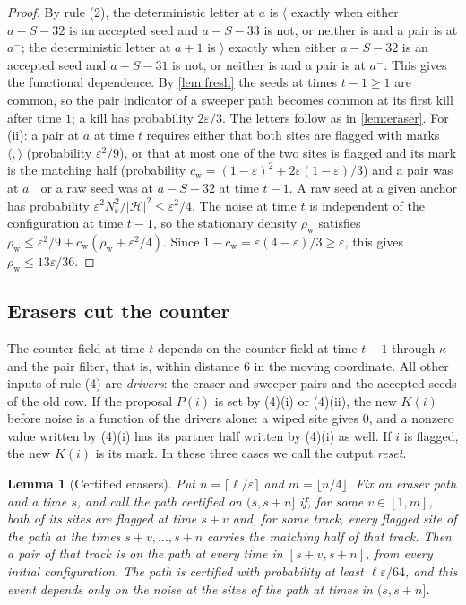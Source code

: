 \documentclass[11pt]{article}
\theoremstyle{plain}
\newtheorem{lemma}[theorem]{Lemma}
\theoremstyle{definition}
\theoremstyle{remark}
\newcommand{\eps}{\varepsilon}
\newcommand{\Hs}{\mathcal H}
\begin{document}
\begin{proof}
By rule (2), the deterministic letter at $a$ is $\langle$ exactly when either $a-S-32$ is an accepted seed and $a-S-33$ is not, or neither is and a pair is at $a^-$; the deterministic letter at $a+1$ is $\rangle$ exactly when either $a-S-32$ is an accepted seed and $a-S-31$ is not, or neither is and a pair is at $a^-$. This gives the functional dependence. By \cref{lem:fresh} the seeds at times $t-1\ge1$ are common, so the pair indicator of a sweeper path becomes common at its first kill after time $1$; a kill has probability $2\eps/3$. The letters follow as in \cref{lem:eraser}. For (ii): a pair at $a$ at time $t$ requires either that both sites are flagged with marks $\langle,\rangle$ (probability $\eps^2/9$), or that at most one of the two sites is flagged and its mark is the matching half (probability $c_{\mathrm w}=(1-\eps)^2+2\eps(1-\eps)/3$) and a pair was at $a^-$ or a raw seed was at $a-S-32$ at time $t-1$. A raw seed at a given anchor has probability $\eps^2N_{\mathrm s}^2/|\Hs|^2\le\eps^2/4$. The noise at time $t$ is independent of the configuration at time $t-1$, so the stationary density $\rho_{\mathrm w}$ satisfies $\rho_{\mathrm w}\le\eps^2/9+c_{\mathrm w}(\rho_{\mathrm w}+\eps^2/4)$. Since $1-c_{\mathrm w}=\eps(4-\eps)/3\ge\eps$, this gives $\rho_{\mathrm w}\le13\eps/36$.
\end{proof}

\subsection{Erasers cut the counter}

The counter field at time $t$ depends on the counter field at time $t-1$ through $\kappa$ and the pair filter, that is, within distance $6$ in the moving coordinate. All other inputs of rule (4) are \emph{drivers}: the eraser and sweeper pairs and the accepted seeds of the old row. If the proposal $P(i)$ is set by (4)(i) or (4)(ii), the new $K(i)$ before noise is a function of the drivers alone: a wiped site gives $0$, and a nonzero value written by (4)(i) has its partner half written by (4)(i) as well. If $i$ is flagged, the new $K(i)$ is its mark. In these three cases we call the output \emph{reset}.

\begin{lemma}[Certified erasers]\label{lem:certified}
Put $n=\lceil\ell/\eps\rceil$ and $m=\lfloor n/4\rfloor$. Fix an eraser path and a time $s$, and call the path \emph{certified on $(s,s+n]$} if, for some $v\in[1,m]$, both of its sites are flagged at time $s+v$ and, for some track, every flagged site of the path at the times $s+v,\dots,s+n$ carries the matching half of that track. Then a pair of that track is on the path at every time in $[s+v,s+n]$, from every initial configuration. The path is certified with probability at least $\ell\eps/64$, and this event depends only on the noise at the sites of the path at times in $(s,s+n]$.
\end{lemma}
\end{document}
